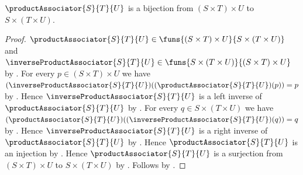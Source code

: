 \begin{theorem}\label{product_associator_bijection}
    $\productAssociator{S}{T}{U}$ is a bijection from
        $(S\times T)\times U$ to $S\times(T\times U)$.
\end{theorem}
\begin{proof}
    $\productAssociator{S}{T}{U}\in
        \funs{(S\times T)\times U}{S\times(T\times U)}$ and
        $\inverseProductAssociator{S}{T}{U}\in
        \funs{S\times(T\times U)}{(S\times T)\times U}$ by
        .
    For every $p\in(S\times T)\times U$ we have
        $(\inverseProductAssociator{S}{T}{U})
            ((\productAssociator{S}{T}{U})(p))=p$ by
        .
    Hence $\inverseProductAssociator{S}{T}{U}$ is a left inverse of
        $\productAssociator{S}{T}{U}$ by
        .
    For every $q\in S\times(T\times U)$ we have
        $(\productAssociator{S}{T}{U})
            ((\inverseProductAssociator{S}{T}{U})(q))=q$ by
        .
    Hence $\inverseProductAssociator{S}{T}{U}$ is a right inverse of
        $\productAssociator{S}{T}{U}$ by
        .
    Hence $\productAssociator{S}{T}{U}$ is an injection by
        .
    Hence $\productAssociator{S}{T}{U}$ is a surjection from
        $(S\times T)\times U$ to $S\times(T\times U)$ by
        .
    Follows by .
\end{proof}

